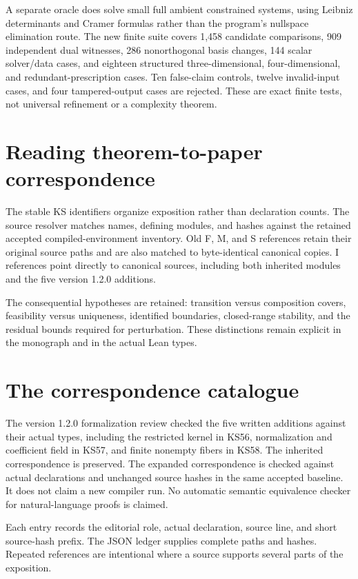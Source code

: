 \documentclass[11pt]{article}
\begin{document}
A separate oracle does solve small full ambient constrained systems, using Leibniz determinants and Cramer formulas rather than the program's nullspace elimination route. The new finite suite covers 1,458 candidate comparisons, 909 independent dual witnesses, 286 nonorthogonal basis changes, 144 scalar solver/data cases, and eighteen structured three-dimensional, four-dimensional, and redundant-prescription cases. Ten false-claim controls, twelve invalid-input cases, and four tampered-output cases are rejected. These are exact finite tests, not universal refinement or a complexity theorem.

\section{Reading theorem-to-paper correspondence}
The stable KS identifiers organize exposition rather than declaration counts. The source resolver matches names, defining modules, and hashes against the retained accepted compiled-environment inventory. Old F, M, and S references retain their original source paths and are also matched to byte-identical canonical copies. I references point directly to canonical sources, including both inherited modules and the five version 1.2.0 additions.

The consequential hypotheses are retained: transition versus composition covers, feasibility versus uniqueness, identified boundaries, closed-range stability, and the residual bounds required for perturbation. These distinctions remain explicit in the monograph and in the actual Lean types.

\clearpage\section{The correspondence catalogue}
The version 1.2.0 formalization review checked the five written additions against their actual types, including the restricted kernel in KS56, normalization and coefficient field in KS57, and finite nonempty fibers in KS58. The inherited correspondence is preserved. The expanded correspondence is checked against actual declarations and unchanged source hashes in the same accepted baseline. It does not claim a new compiler run. No automatic semantic equivalence checker for natural-language proofs is claimed.

Each entry records the editorial role, actual declaration, source line, and short source-hash prefix. The JSON ledger supplies complete paths and hashes. Repeated references are intentional where a source supports several parts of the exposition.
\end{document}
